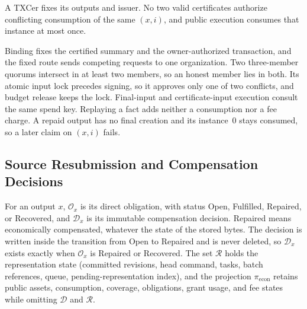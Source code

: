 \begin{lemma}
\label{lem:security-consumption}
A TXCer fixes its outputs and issuer. No two valid certificates
authorize conflicting consumption of the same $(x,i)$, and public
execution consumes that instance at most once.
\end{lemma}
\begin{IEEEproof}
Binding fixes the certified summary and the owner-authorized transaction, and the fixed route sends competing requests to one organization. Two three-member quorums intersect in at least two members, so an honest member lies in both. Its atomic input lock precedes signing, so it approves only one of two conflicts, and budget release keeps the lock. Final-input and certificate-input execution consult the same spend key. Replaying a fact adds neither a consumption nor a fee charge. A repaid output has no final creation and its instance~0 stays consumed, so a later claim on $(x,i)$ fails.
\end{IEEEproof}

\subsection{Source Resubmission and Compensation Decisions}
\label{sec:security-decision}

For an output $x$, $\mathcal O_x$ is its direct obligation, with status Open, Fulfilled, Repaired, or Recovered, and $\mathcal D_x$ is its immutable compensation decision. Repaired means economically compensated, whatever the state of the stored bytes. The decision is written inside the transition from Open to Repaired and is never deleted, so $\mathcal D_x$ exists exactly when $\mathcal O_x$ is Repaired or Recovered. The set $\mathcal R$ holds the representation state (committed revisions, head command, tasks, batch references, queue, pending-representation index), and the projection $\pi_{\mathrm{econ}}$ retains public assets, consumption, coverage, obligations, grant usage, and fee states while omitting $\mathcal D$ and $\mathcal R$.

